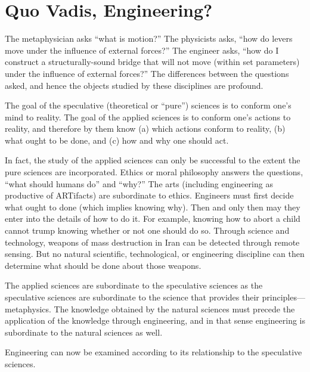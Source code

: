 \section{Quo Vadis, Engineering?}

The metaphysician asks ``what is motion?'' The physicists asks, ``how do levers move under the influence of external forces?'' The engineer asks, ``how do I construct a structurally-sound bridge that will not move (within set parameters) under the influence of external forces?'' The differences between the questions asked, and hence the objects studied by these disciplines are profound.

The goal of the speculative (theoretical or ``pure'') sciences is to conform one's mind to reality. The goal of the applied sciences is to conform one's actions to reality, and therefore by them know (a) which actions conform to reality, (b) what ought to be done, and (c) how and why one should act.

In fact, the study of the applied sciences can only be successful to the extent the pure sciences are incorporated. Ethics or moral philosophy answers the questions, ``what should humans do'' and ``why?'' The arts (including engineering as productive of ARTifacts) are subordinate to ethics. Engineers must first decide what ought to done (which implies knowing why). Then and only then may they enter into the details of how to do it. For example, knowing how to abort a child cannot trump knowing whether or not one should do so. Through science and technology, weapons of mass destruction in Iran can be detected through remote sensing. But no natural scientific, technological, or engineering discipline can then determine what should be done about those weapons.

The applied sciences are subordinate to the speculative sciences as the speculative sciences are subordinate to the science that provides their principles---metaphysics. The knowledge obtained by the natural sciences must precede the application of the knowledge through engineering, and in that sense engineering is subordinate to the natural sciences as well.

Engineering can now be examined according to its relationship to the speculative sciences.


